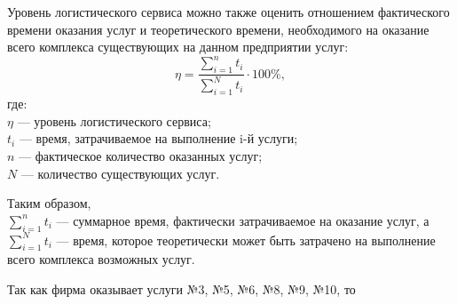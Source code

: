 Уровень логистического сервиса можно также оценить отношением фактического времени оказания услуг и теоретического времени, необходимого на оказание всего комплекса существующих на данном предприятии услуг:
\[ \eta = \dfrac{\sum\limits_{i=1}^{n} t_i}{\sum\limits_{i=1}^{N} t_i} \cdot 100\%,\]
где: \\
$\eta$ --- уровень логистического сервиса;
\\
$t_i$ --- время, затрачиваемое на выполнение i-й услуги;
\\
$n$ --- фактическое количество оказанных услуг;
\\
$N$ --- количество существующих услуг.

Таким образом, 
\\
$\sum\limits_{i=1}^{n} t_i$ --- суммарное время, фактически затрачиваемое на оказание услуг, а 
\\
$\sum\limits_{i=1}^{N} t_i$ --- время, которое теоретически может быть затрачено на выполнение всего комплекса возможных услуг.

Так как фирма оказывает услуги №3, №5, №6, №8, №9, №10, то